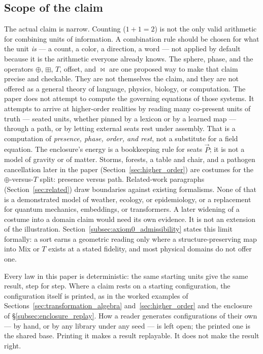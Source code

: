 \documentclass[12pt, a4paper]{article}
\begin{document}
\subsection{Scope of the claim}
\label{subsec:claim_scope}
The actual claim is narrow. Counting ($1+1=2$) is not the only valid
arithmetic for combining units of information. A combination rule
should be chosen for what the unit \emph{is} --- a count, a color, a
direction, a word --- not applied by default because it is the
arithmetic everyone already knows. The sphere, phase, and the
operators $\oplus$, $\boxplus$, $T$, offset, and $\bowtie$ are one
proposed way to make that claim precise and checkable. They are not
themselves the claim, and they are not offered as a general theory of
language, physics, biology, or computation.
The paper does not attempt to compute the governing equations of
those systems. It attempts to arrive at higher-order realities by
reading many co-present units of truth --- seated units, whether
pinned by a lexicon or by a learned map --- through a path, or by
letting external seats rest under assembly. That is a computation of
\emph{presence, phase, order, and rest}, not a substitute for a field
equation. The enclosure's energy is a bookkeeping rule for seats
$\vec P$; it is not a model of gravity or of matter.
Storms, forests, a table and chair, and a pathogen cancellation later in the paper
(Section~\ref{sec:higher_order}) are costumes for the
$\oplus$-versus-$T$ split: presence versus path. Related-work
paragraphs (Section~\ref{sec:related}) draw boundaries against
existing formalisms. None of that is a demonstrated model of weather,
ecology, or epidemiology, or a replacement for quantum mechanics,
embeddings, or transformers. A later widening of a costume into a
domain claim would need its own evidence. It is not an extension of
the illustration.
Section~\ref{subsec:axiom0_admissibility} states this limit formally:
a sort earns a geometric reading only where a structure-preserving
map into Mix or $T$ exists at a stated fidelity, and most physical
domains do not offer one.

Every law in this paper is deterministic: the same starting units
give the same result, step for step. Where a claim rests on a
starting configuration, the configuration itself is printed, as in
the worked examples of Sections~\ref{sec:transformation_algebra}
and~\ref{sec:higher_order} and the enclosure of
\S\ref{subsec:enclosure_replay}. How a reader generates
configurations of their own --- by hand, or by any library under any
seed --- is left open; the printed one is the shared base. Printing
it makes a result replayable. It does not make the result right.
\end{document}
